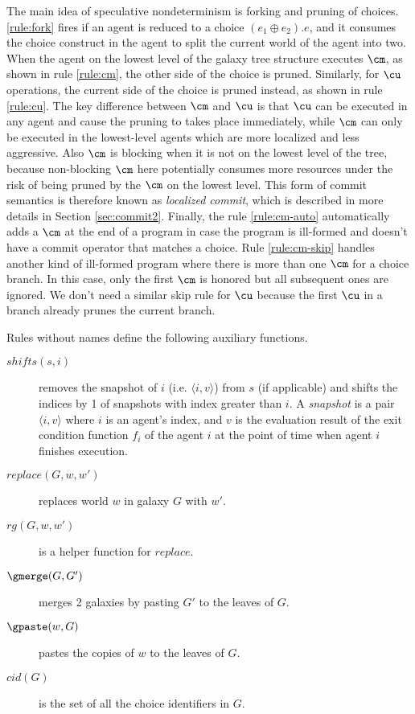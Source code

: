 The main idea of speculative nondeterminism is forking and pruning of choices.
\ref{rule:fork} fires if an agent is reduced to
a choice $(e_1\oplus e_2) .e$,
and it consumes the choice construct in the agent to split the current world of
the agent into two.
When the agent on the lowest level of the galaxy tree structure
executes $\cm$, as shown in rule \ref{rule:cm},
the other side of the choice is pruned.
Similarly, for $\cu$ operations, the current side of the choice is pruned instead,
as shown in rule \ref{rule:cu}.
The key difference between $\cm$ and $\cu$ is that
$\cu$ can be executed in any agent and cause the pruning to takes place immediately,
while $\cm$ can only be executed in the lowest-level agents which are
more localized and less aggressive.
Also $\cm$ is blocking when it is not on the lowest level of the tree,
because non-blocking $\cm$ here potentially consumes more resources 
under the risk of being pruned by the $\cm$ on the lowest level. 
This form of commit semantics is therefore known as \emph{localized commit},
which is described in more details in Section \ref{sec:commit2}.
Finally, the rule \ref{rule:cm-auto} automatically adds a $\cm$ at the end of a program 
in case the program is ill-formed and doesn't have a commit operator that matches
a choice. 
Rule \ref{rule:cm-skip} handles another kind of ill-formed program where
there is more than one $\cm$ for a choice branch. 
In this case, only the first $\cm$ is honored but all subsequent ones are ignored.
We don't need a similar skip rule for $\cu$ because the first $\cu$ in a branch
already prunes the current branch.

Rules without names define the following auxiliary functions.
\begin{description}
\item[$shifts(s,i)$] removes the snapshot of $i$ (i.e. $\langle i,v\rangle$) from $s$ (if applicable) and shifts the indices by 1 of snapshots with index greater than $i$.
A \emph{snapshot} is a pair $\langle i,v\rangle$ where $i$ is an agent's index, and $v$ is the evaluation result of the exit condition function $f_i$ of the agent $i$ at the point of time when agent $i$ finishes execution.
\item[$replace(G,w,w')$] replaces world $w$ in galaxy $G$ with $w'$.
\item[$rg(G,w,w')$] is a helper function for $replace$.
\item[$\gmerge(G,G')$] merges 2 galaxies by pasting $G'$ to the leaves of $G$.
\item[$\gpaste(w,G)$] pastes the copies of $w$ to the leaves of $G$.
\item[$cid(G)$] is the set of all the choice identifiers in $G$.
\end{description}

